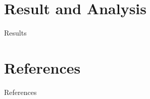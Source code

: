 \documentclass{beamer}
\newcommand{\link}[2]{\href{#1}{\textit{\color{blue}{#2}}}}%
\begin{document}

	\section{Result and Analysis}
	\begin{frame}{Results}
		
	\end{frame}


\section{References}
\begin{frame}{References}
	\nocite{*}
	
	
\end{frame}
\end{document}
